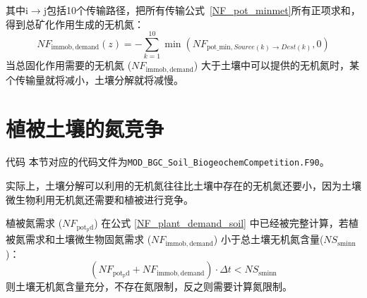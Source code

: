 其中$\mathrm {i \rightarrow j}$包括10个传输路径，把所有传输公式~\eqref{NF_pot_minmet}所有正项求和，得到总矿化作用生成的无机氮：
\begin{equation}\label{NF_immob_demand_vr}
  NF_{\mathrm{immob,demand}}(z)=-\sum_{k=1}^{10}\min{\left(NF_{\mathrm{pot\_min},Source(k)\rightarrow Dest (k)}, 0\right)}
\end{equation}
当总固化作用需要的无机氮 ($NF_{\mathrm{immob,demand}}$) 大于土壤中可以提供的无机氮时，某个传输量就将减小，土壤分解就将减慢。


\section{植被土壤的氮竞争}\label{植被土壤的氮竞争}
\begin{mymdframed}{代码}
  本节对应的代码文件为\texttt{MOD\_BGC\_Soil\_BiogeochemCompetition.F90}。
\end{mymdframed}
实际上，土壤分解可以利用的无机氮往往比土壤中存在的无机氮还要小，因为土壤微生物利用无机氮还需要和植被进行竞争。

植被氮需求 ($NF_{\mathrm{pot_pd}}$) 在公式 \eqref{NF_plant_demand_soil} 中已经被完整计算，若植被氮需求和土壤微生物固氮需求 ($NF_{\mathrm{immob,demand}}$) 小于总土壤无机氮含量(${NS}_{\mathrm{sminn}}$)：
\begin{equation}
  \left(NF_{\mathrm{pot_pd}}+NF_{\mathrm{immob,demand}}\right)\cdot\Delta t<NS_{\mathrm{sminn}}
\end{equation}
则土壤无机氮含量充分，不存在氮限制，反之则需要计算氮限制。

